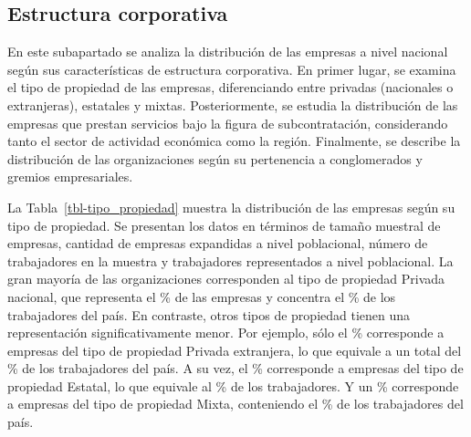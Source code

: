 \documentclass[
  11pt,
]{article}
\begin{document}
\FloatBarrier

\subsection{Estructura corporativa}\label{estructura-corporativa}

En este subapartado se analiza la distribución de las empresas a nivel
nacional según sus características de estructura corporativa. En primer
lugar, se examina el tipo de propiedad de las empresas, diferenciando
entre privadas (nacionales o extranjeras), estatales y mixtas.
Posteriormente, se estudia la distribución de las empresas que prestan
servicios bajo la figura de subcontratación, considerando tanto el
sector de actividad económica como la región. Finalmente, se describe la
distribución de las organizaciones según su pertenencia a conglomerados
y gremios empresariales.

La Tabla~\ref{tbl-tipo_propiedad} muestra la distribución de las
empresas según su tipo de propiedad. Se presentan los datos en términos
de tamaño muestral de empresas, cantidad de empresas expandidas a nivel
poblacional, número de trabajadores en la muestra y trabajadores
representados a nivel poblacional. La gran mayoría de las organizaciones
corresponden al tipo de propiedad Privada nacional, que representa el
\% de las empresas y concentra el \% de los
trabajadores del país. En contraste, otros tipos de propiedad tienen una
representación significativamente menor. Por ejemplo, sólo el
\% corresponde a empresas del tipo de propiedad Privada
extranjera, lo que equivale a un total del \% de los
trabajadores del país. A su vez, el \% corresponde a empresas
del tipo de propiedad Estatal, lo que equivale al \% de los
trabajadores. Y un \% corresponde a empresas del tipo de
propiedad Mixta, conteniendo el \% de los trabajadores del
país.
\end{document}
